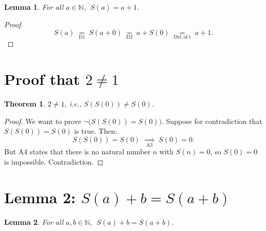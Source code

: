 \documentclass[12pt, a4paper]{article}
\theoremstyle{plain}
\newtheorem{lemma}{Lemma}
\newtheorem{theorem}{Theorem}
\theoremstyle{definition}
\begin{document}
\begin{lemma}\label{lem:succ}
For all $a \in \mathbb{N}$, $\;S(a) = a + 1$.
\end{lemma}

\begin{proof}
\[
  S(a)
    \;\underset{\mathrm{D1}}{=}\; S(a + 0)
    \;\underset{\mathrm{D2}}{=}\; a + S(0)
    \;\underset{\mathrm{Def.\,of\,1}}{=}\; a + 1.
\]
\end{proof}

\section*{Proof that $2 \neq 1$}

\begin{theorem}
$2 \neq 1$, i.e., $S(S(0)) \neq S(0)$.
\end{theorem}

\begin{proof}
We want to prove $\neg\bigl(S(S(0)) = S(0)\bigr)$.
Suppose for contradiction that $S(S(0)) = S(0)$ is true. Then:
\[
  S(S(0)) = S(0) \;\underset{\mathrm{A3}}{\implies}\; S(0) = 0.
\]
But A4 states that there is no natural number $n$ with $S(n) = 0$,
so $S(0) = 0$ is impossible. Contradiction.
\end{proof}

\section*{Lemma 2: $S(a) + b = S(a + b)$}

\begin{lemma}\label{lem:succ-add}
For all $a, b \in \mathbb{N}$, $\;S(a) + b = S(a + b)$.
\end{lemma}
\end{document}
